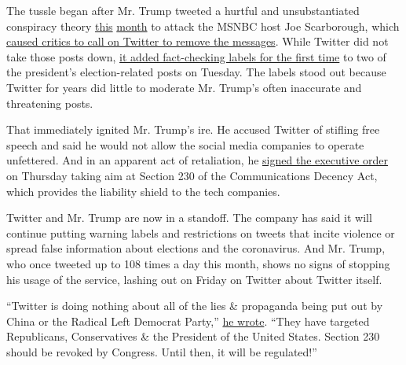 The tussle began after Mr. Trump tweeted a hurtful and unsubstantiated
conspiracy theory
\href{https://twitter.com/realDonaldTrump/status/1257258214615367680?ref_src=twsrc\%5Etfw\%7Ctwcamp\%5Etweetembed\%7Ctwterm\%5E1257258214615367680\%7Ctwgr\%5E\&ref_url=https\%3A\%2F\%2Fwww.nytimes3xbfgragh.onion\%2F2020\%2F05\%2F26\%2Fbusiness\%2Fletter-to-twitter-ceo.html}{this}
\href{https://twitter.com/realDonaldTrump/status/1260161295019630592?ref_src=twsrc\%5Etfw\%7Ctwcamp\%5Etweetembed\%7Ctwterm\%5E1260161295019630592\%7Ctwgr\%5E\&ref_url=https\%3A\%2F\%2Fwww.nytimes3xbfgragh.onion\%2F2020\%2F05\%2F26\%2Fbusiness\%2Fletter-to-twitter-ceo.html}{month}
to attack the MSNBC host Joe Scarborough, which
\href{https://www.nytimes3xbfgragh.onion/2020/05/26/opinion/trump-scarborough-twitter.html}{caused
critics to call on Twitter to remove the messages}. While Twitter did
not take those posts down,
\href{https://www.nytimes3xbfgragh.onion/2020/05/26/technology/twitter-trump-mail-in-ballots.html}{it
added fact-checking labels for the first time} to two of the president's
election-related posts on Tuesday. The labels stood out because Twitter
for years did little to moderate Mr. Trump's often inaccurate and
threatening posts.

That immediately ignited Mr. Trump's ire. He accused Twitter of stifling
free speech and said he would not allow the social media companies to
operate unfettered. And in an apparent act of retaliation, he
\href{https://www.nytimes3xbfgragh.onion/2020/05/28/us/politics/trump-jack-dorsey.html}{signed
the executive order} on Thursday taking aim at Section 230 of the
Communications Decency Act, which provides the liability shield to the
tech companies.

Twitter and Mr. Trump are now in a standoff. The company has said it
will continue putting warning labels and restrictions on tweets that
incite violence or spread false information about elections and the
coronavirus. And Mr. Trump, who once tweeted up to 108 times a day this
month, shows no signs of stopping his usage of the service, lashing out
on Friday on Twitter about Twitter itself.

``Twitter is doing nothing about all of the lies \& propaganda being put
out by China or the Radical Left Democrat Party,''
\href{https://twitter.com/realDonaldTrump/status/1266326065833824257}{he
wrote}. ``They have targeted Republicans, Conservatives \& the President
of the United States. Section 230 should be revoked by Congress. Until
then, it will be regulated!''

